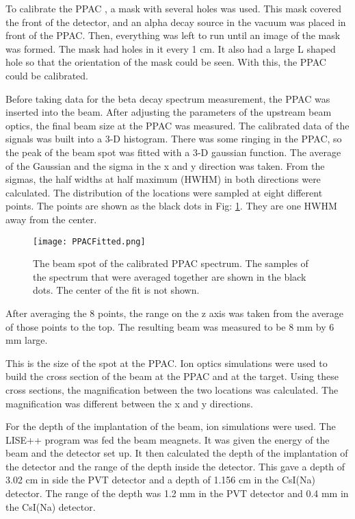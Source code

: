 To calibrate the PPAC , a mask with several holes was used. 
This mask covered the front of the detector, and an alpha decay source in the vacuum was placed in front of the PPAC.
Then, everything was left to run until an image of the mask was formed.
The mask had holes in it every 1 cm. 
It also had a large L shaped hole so that the orientation of the mask could be seen. 
With this, the PPAC could be calibrated.

Before taking data for the beta decay spectrum measurement, the PPAC was inserted into the beam.
After adjusting the parameters of the upstream beam optics, the final beam size at the PPAC was measured.
The calibrated data of the signals was built into a 3-D histogram.
There was some ringing in the PPAC, so the peak of the beam spot was fitted with a 3-D gaussian function.
The average of the Gaussian and the sigma in the x and y direction was taken. 
From the sigmas, the half widths at half maximum (HWHM) in both directions were calculated. 
The distribution of the locations were sampled at eight different points. 
The points are shown as the black dots in Fig: \ref{fig:PPACSpotch}.
They are one HWHM away from the center. 

\begin{figure}
	\texttt{[image: PPACFitted.png]}
	\caption{The beam spot of the calibrated PPAC spectrum. 
		 The samples of the spectrum that were averaged together are shown in the black dots.
		 The center of the fit is not shown.}
	\label{fig:PPACSpotch}
\end{figure}  

After averaging the 8 points, the range on the z axis was taken from the average of those points to the top.
The resulting beam was measured to be 8 mm by 6 mm large.

This is the size of the spot at the PPAC. 
Ion optics simulations were used to build the cross section of the beam at the PPAC and at the target.
Using these cross sections, the magnification between the two locations was calculated.
The magnification was different between the x and y directions.

For the depth of the implantation of the beam, ion simulations were used. 
The LISE++ program was fed the beam meagnets. It was given the energy of the beam and the detector set up. 
It then calculated the depth of the implantation of the detector and the range of the depth inside the detector. 
This gave a depth of 3.02 cm in side the PVT detector and a depth of 1.156 cm in the CsI(Na) detector. 
The range of the depth was 1.2 mm in the PVT detector and 0.4 mm in the CsI(Na) detector.

